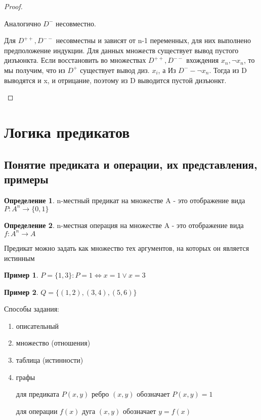 \documentclass[a4paper]{article}
\theoremstyle{definition}
\newtheorem*{example}{Пример}
\newtheorem*{definition}{Определение}
\theoremstyle{remark}
\begin{document}
\begin{proof}
\begin{itemize}
            Аналогично $D^-$ несовместно.

            Для $D^{++}, D^{--}$ несовместны и зависят от n-1 переменных, для них выполнено предположение индукции.
            Для данных множеств существует вывод пустого дизъюнкта. Если восстановить во множествах $D^{++}, D^{--}$
            вхождения $x_n, \neg x_n$, то мы получим, что из $D^+$ существует вывод диз. $x_i$, а Из
            $D^- - \neg x_n$. Тогда из D выводятся и x, и отрицание, поэтому из D выводится пустой дизъюнкт.
        \end{itemize}
    \end{proof}
    \section{Логика предикатов}
    \subsection{Понятие предиката и операции, их представления, примеры}
    \begin{definition}
        n-местный предикат на множестве A - это отображение вида $P: A^n \rightarrow \{0, 1\}$ 
    \end{definition}
    \begin{definition}
        n-местная операция на множестве A - это отображение вида $f: A^n \rightarrow A$ 
    \end{definition}
    Предикат можно задать как множество тех аргументов, на которых он является истинным
    \begin{example}
        $P = \{1, 3\} : P = 1 \Leftrightarrow x = 1 \vee x = 3$
    \end{example}
    \begin{example}
        $Q = \{(1, 2), (3, 4), (5, 6)\}$
    \end{example}
    Способы задания:
    \begin{enumerate}
        \item описательный
        \item множество (отношения)
        \item таблица (истинности)
        \item графы 
        
        для предиката $P(x, y)$ ребро $(x, y)$ обозначает $P(x,y) = 1$

        для операции $f(x)$ дуга $(x, y)$ обозначает $y = f(x)$
    \end{enumerate}
\end{document}
